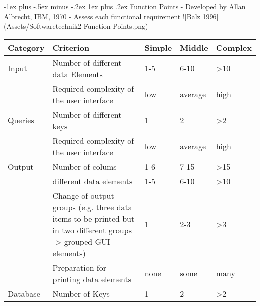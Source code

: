 \documentclass[a4paper]{article}
\makeatletter
\renewcommand{\subsubsection}{\@startsection{subsubsection}{3}{0mm}%
                                {-1ex plus -.5ex minus -.2ex}%
                                {1ex plus .2ex}%
                                {\normalfont\small\bfseries}}
\makeatother
\begin{document}
\begin{multicols}{3}
  \subsubsection{Function Points}
  - Developed by Allan Albrecht, IBM, 1970
  - Assess each functional requirement
  ![Balz 1996](Assets/Softwaretechnik2-Function-Points.png)
  
  \begin{tabular}{l|l|l|l|l}
   Category       & Criterion & Simple & Middle             & Complex                        \\\hline
   Input          & Number of different data Elements                                                                                 & 1-5    & 6-10               & >10 \\
                   & Required complexity of the user interface                                                                         & low    & average            & high \\
    Queries        & Number of different keys                                                                                          & 1      & 2                  & >2 \\
                   & Required complexity of the user interface                                                                         & low    & average            & high \\
    Output         & Number of colums                                                                                                  & 1-6    & 7-15               & >15 \\
                   & different data elements                                                                                           & 1-5    & 6-10               & >10 \\
                   & Change of output groups (e.g. three data items to be printed but in two different groups -> grouped GUI elements) & 1      & 2-3                & >3 \\
                   & Preparation for printing data elements                                                                            & none   & some               & many \\
    Database       & Number of Keys                                                                                                    & 1      & 2                  & >2 \\

\end{tabular}
\end{multicols}
\end{document}
